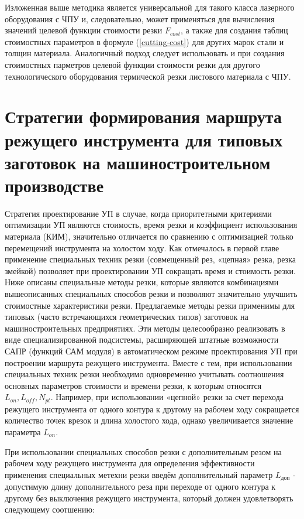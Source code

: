 \documentclass[12pt,twoside]{report}
\begin{document}
Изложенная выше методика является универсальной
для такого класса лазерного оборудования с ЧПУ и,
следовательно, может применяться для вычисления значений
целевой функции стоимости резки
$F_{cost}$,
а также для создания таблиц стоимостных параметров в формуле (\ref{cutting-cost})
для других марок стали и толщин материала.
Аналогичный подход следует использовать и при создания
стоимостных парметров целевой функции стоимости резки
для другого технологического оборудования термической
резки листового материала с ЧПУ.

\section{Стратегии формирования маршрута режущего инструмента для типовых заготовок на машиностроительном производстве}

Стратегия проектирование УП в случае,
когда приоритетными критериями оптимизации УП являются стоимость,
время резки и коэффициент использования материала (КИМ),
значительно отличается по сравнению с оптимизацией
только перемещений инструмента на холостом ходу.
Как отмечалось в первой главе применение специальных техник резки
(совмещенный рез, «цепная» резка, резка змейкой)
позволяет при проектировании УП сокращать время и стоимость резки.
Ниже описаны специальные методы резки,
которые являются комбинациями вышеописанных специальных способов резки
и позволяют значительно улучшить стоимостные характеристики резки.
Предлагаемые методы резки применимы для типовых
(часто встречающихся геометрических типов)
заготовок на машиностроительных предприятиях.
Эти методы целесообразно реализовать в
виде специализированной подсистемы,
расширяющей штатные возможности САПР (функций САМ модуля)
в автоматическом режиме проектирования УП при построении
маршрута режущего инструмента.
Вместе с тем, при использовании специальных техник
резки необходимо одновременно учитывать соотношения
основных параметров стоимости и времени резки,
к которым относятся
$L_{on}, L_{off}, N_{pt}$.
Например, при использовании «цепной» резки
за счет перехода режущего инструмента от одного
контура к другому на рабочем ходу сокращается
количество точек врезок и длина холостого хода,
однако увеличивается значение параметра
$L_{on}$.

При использовании специальных способов резки
с дополнительным резом на рабочем ходу режущего инструмента
для определения эффективности применения специальных
метехни резки введём дополнительный параметр
$L_\text{доп}$ - допустимую длину дополнительного реза
при переходе от одного контура к другому
без выключения режущего инструмента,
который должен удовлетворять следующему соотшению:
\end{document}
